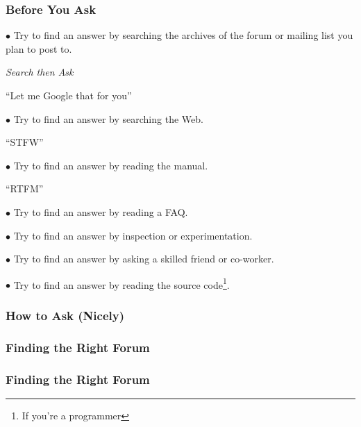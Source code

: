 \documentclass{beamer}
\begin{document}
  \begin{frame}%
    \frametitle{Before You Ask}
        
    $\bullet$ Try to find an answer by searching the archives of the forum or mailing list you plan to post to.
    \begin{center}
     \textit{Search then Ask}
    \end{center}
    \begin{center}
     ``Let me Google that for you''
    \end{center}

    $\bullet$ Try to find an answer by searching the Web.
    \begin{center}
     ``STFW''
    \end{center}

    $\bullet$ Try to find an answer by reading the manual.
    \begin{center}
     ``RTFM''
    \end{center}

    $\bullet$ Try to find an answer by reading a FAQ.

    $\bullet$ Try to find an answer by inspection or experimentation.

    $\bullet$ Try to find an answer by asking a skilled friend or co-worker.

    $\bullet$ Try to find an answer by reading the source code\footnote{If you're a programmer}.
  \end{frame}
    \begin{frame}
    \frametitle{How to Ask (Nicely)}
    
    \begin{center}
     
      
    \end{center}  
  \end{frame}
  \begin{frame}
    \frametitle{Finding the Right Forum}
    
    \begin{center}
     
      
    \end{center}  
  \end{frame}
  \begin{frame}
    \frametitle{Finding the Right Forum}
    
    \begin{center}
     
      
    \end{center}  
  \end{frame}
\end{document}
